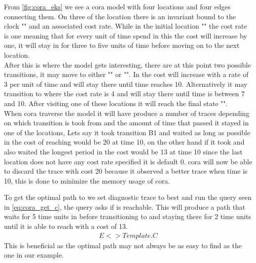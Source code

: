 From \cref{fig:cora_eks} we see a \gls{cora} model with four locations and four edges connecting them. On three of the location there is an invariant bound to the clock "" and an associated cost rate. While in the initial location "" the cost rate is one meaning that for every unit of time spend in this  the cost will increase by one, it will stay in  for three to five units of time before moving on to the next location.\\
After this is where the model gets interesting, there are at this point two possible transitions, it may move to either "" or "". In  the cost will increase with a rate of 3 per unit of time and will stay there until time reaches 10. Alternatively it may transition to  where the cost rate is 4 and will stay there until time is between 7 and 10. After visiting one of these locations it will reach the final state "". \\
When \gls{cora} traverse the model it will have produce a number of traces depending on which transition is took from  and the amount of time that passed it stayed in one of the locations, Lets say it took transition B1 and waited as long as possible in  the cost of reaching  would be 20 at time 10, on the other hand if it took  and also waited the longest period in  the cost would be 13 at time 10 since the last location does not have any cost rate specified it is default 0. \gls{cora} will now be able to discard the trace with cost 20 because it observed a better trace when time is 10, this is done to minimize the memory usage of \gls{cora}.

To get the optimal path to  we set diagnostic trace to best and run the query seen in \cref{eq:cora_get_c}, the query asks if  is reachable. This will produce a path that waits for 5 time units in  before transitioning to  and staying there for 2 time units until it is able to reach  with a cost of 13.
\begin{align}
E<> Template.C
\label{eq:cora_get_c}
\end{align}
This is beneficial as the optimal path may not always be as easy to find as the one in our example. 


